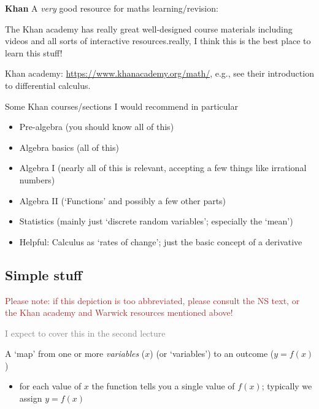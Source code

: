 \documentclass[]{article}
\providecommand{\tightlist}{%
  \setlength{\itemsep}{0pt}\setlength{\parskip}{0pt}}
\begin{document}
\textbf{Khan} A \emph{very} good resource for maths learning/revision:

The Khan academy has really great well-designed course materials including videos and all sorts of interactive resources.really, I think this is the best place to learn this stuff!

Khan academy: \url{https://www.khanacademy.org/math/}, e.g., see their introduction to differential calculus.

Some Khan courses/sections I would recommend in particular

\begin{itemize}
\item
  Pre-algebra (you should know all of this)
\item
  Algebra basics (all of this)
\item
  Algebra I (nearly all of this is relevant, accepting a few things like irrational numbers)
\item
  Algebra II (`Functions' and possibly a few other parts)
\item
  Statistics (mainly just `discrete random variables'; especially the `mean')
\item
  Helpful: Calculus as `rates of change'; just the basic concept of a derivative
\end{itemize}

\hypertarget{simple-stuff}{%
\subsection{Simple stuff}\label{simple-stuff}}

\textcolor{brown}{Please note: if this depiction is too abbreviated, please consult the NS text, or the Khan academy and Warwick resources mentioned above!}

\textcolor{grey}{I expect to cover this in the second lecture}

\begin{description}
\tightlist
\item[(Univariate) Function]
A `map' from one or more \emph{variables} (\(x\)) (or `variables') to an outcome (\(y=f(x)\))
\end{description}

\begin{itemize}
\tightlist
\item
  for each value of \(x\) the function tells you a single value of \(f(x)\); typically we assign \(y=f(x)\)
\end{itemize}
\end{document}
